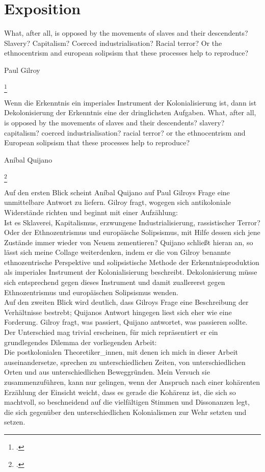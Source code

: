 \section{Exposition}
\epigraph{
    What, after all, is opposed by the movements of slaves and their descendents?
Slavery? Capitalism? Coerced industrialisation? Racial terror?
Or the ethnocentrism and european solipsism that these processes help to reproduce?
}{Paul Gilroy\footnotemark}\footcitetext{gilroyatlantic} 

\epigraph{ Wenn die Erkenntnis ein imperiales Instrument der Kolonialisierung
ist, dann ist Dekolonisierung der Erkenntnis eine der dringlichsten Aufgaben.
What, after all, is opposed by the movements of slaves and their descendents?
slavery? capitalism? coerced industrialisation? racial terror?  or the
ethnocentrism and European solipsism that these processes help to reproduce?
}{Aníbal Quijano\footnotemark}\footcitetext{quijano}

Auf den ersten Blick scheint Aníbal Quijano auf Paul Gilroys Frage eine
unmittelbare Antwort zu liefern. Gilroy fragt, wogegen sich antikoloniale
Widerstände richten und beginnt mit einer Aufzählung:\\
Ist es Sklaverei,
Kapitalismus, erzwungene Industrialisierung, rassistischer Terror? Oder der
Ethnozentrismus und europäische Solipsismus, mit Hilfe dessen sich jene
Zustände immer wieder von Neuem zementieren? Quijano schließt hieran an, so
lässt sich meine Collage weiterdenken, indem er die von Gilroy benannte
ethnozentrische Perspektive und solipsistische Methode der Erkenntnisproduktion
als imperiales Instrument der Kolonialisierung beschreibt. Dekolonisierung
müsse sich entsprechend gegen dieses Instrument und damit zuallererst gegen
Ethnozentrismus und europäischen Solipsismus wenden.\\
Auf den zweiten Blick wird deutlich, dass Gilroys Frage eine Beschreibung der
Verhältnisse bestrebt; Quijanos Antwort hingegen liest sich eher wie eine
Forderung. Gilroy fragt, was passiert, Quijano antwortet, was passieren sollte.
Der Unterschied mag trivial erscheinen, für mich repräsentiert er ein
grundlegendes Dilemma der vorliegenden Arbeit:\\
Die postkolonialen Theoretiker\_innen, mit denen ich mich in dieser Arbeit
auseinandersetze, sprechen zu unterschiedlichen Zeiten, von unterschiedlichen
Orten und aus unterschiedlichen Beweggründen. Mein Versuch sie
zusammenzuführen, kann nur gelingen, wenn der Anspruch nach einer kohärenten
Erzählung der Einsicht weicht, dass es gerade die Kohärenz ist, die sich so
machtvoll, so beschneidend auf die vielfältigen Stimmen und Dissonanzen legt,
die sich gegenüber den unterschiedlichen Kolonialismen zur Wehr setzten und
setzen.\\

